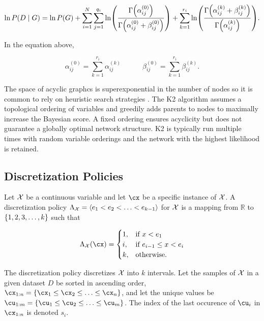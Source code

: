 \begin{small}
\begin{equation}
\label{eq:BayesianScore}
  \ln P(D\mid G) = \ln P(G) + \sum_{i=1}^N \sum_{j=1}^{q_i} \ln \paren{
    \frac{
      \Gamma\paren{\alpha_{ij}^{(0)}}
    }{
      \Gamma\paren{\alpha_{ij}^{(0)} + \beta_{ij}^{(0)}}
    }
  } + \sum_{k=1}^{r_i} \ln \paren{
    \frac{
      \Gamma\paren{\alpha_{ij}^{(k)} + \beta_{ij}^{(k)}}
    }{
      \Gamma\paren{\alpha_{ij}^{(k)}}
    }
  }\text{.}
\end{equation}
\end{small}

In the equation above,

\begin{equation}
\alpha_{ij}^{(0)} = \sum_{k=1}^{r_i} \alpha_{ij}^{(k)} \quad \qquad \beta_{ij}^{(0)} = \sum_{k=1}^{r_i} \beta_{ij}^{(k)}\text{.}
\end{equation}

The space of acyclic graphcs is superexponential in the number of nodes so it is common to rely on heuristic search strategies \citep{PGM_2009}.
The K2 algorithm assumes a topological ordering of variables and greedily adds parents to nodes to maximally increase the Bayesian score.
A fixed ordering ensures acyclicity but does not guarantee a globally optimal network structure.
K2 is typically run multiple times with random variable orderings and the network with the highest likelihood is retained.

\subsection{Discretization Policies}
\label{subsec:disc_policy}

Let $\mathcal{X}$ be a continuous variable and let $\cx$ be a specific instance of $\mathcal{X}$.
A discretization policy $\Lambda_{\mathcal{X}} = \langle e_1 < e_2 < \ldots < e_{k-1} \rangle$ for $\mathcal{X}$ is a mapping from $\mathbb{R}$ to $\curly{1,2,3,\ldots,k}$ such that

\begin{equation}
  \Lambda_{\cX}(\cx) = \begin{cases}
    1, & \text{if $x<e_1$}\\
    i, & \text{if $e_{i-1} \leq x < e_i$}\\
    k, & \text{otherwise.}
  \end{cases}
\end{equation}

\noindent
The discretization policy discretizes $\mathcal{X}$ into $k$ intervals.
Let the samples of $\mathcal{X}$ in a given dataset $D$ be sorted in ascending order, ${\cx_{1:n} = \curly{\cx_1 \leq \cx_2 \leq \ldots \leq \cx_n}}$, and let the unique values be ${\cu_{1:m} = \curly{\cu_1 \leq \cu_2 \leq \ldots \leq \cu_{m}}}$.
The index of the last occurence of $\cu_i$ in $\cx_{1:n}$ is denoted $s_i$.

